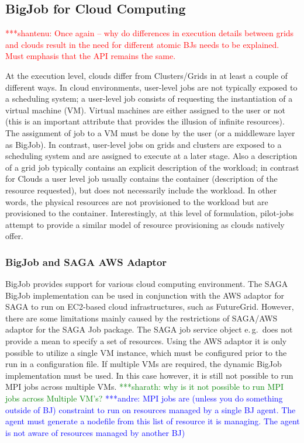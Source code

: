 \documentclass[conference,final]{IEEEtran}
\newcommand{\jhanote}[1]{ {\textcolor{red} { ***shantenu: #1 }}}
\newcommand{\alnote}[1]{ {\textcolor{blue} { ***andre: #1 }}}
\newcommand{\smnote}[1]{ {\textcolor{green} { ***sharath: #1 }}}
\newcommand{\alnote}[1]{}
\newcommand{\smnote}[1]{}
\newcommand{\jhanote}[1]{}
\begin{document}
\subsection{BigJob for Cloud Computing}

\jhanote{Once again -- why do differences in execution details between
  grids and clouds result in the need for different atomic BJs needs
  to be explained. Must emphasis that the API remains the same.}

At the execution level, clouds differ from Clusters/Grids in at least a couple
of different ways. In cloud environments, user-level jobs are not typically
exposed to a scheduling system; a user-level job consists of requesting the
instantiation of a virtual machine (VM). Virtual machines are either assigned to
the user or not (this is an important attribute that provides the illusion of
infinite resources). The assignment of job to a VM must be done by the user (or
a middleware layer as BigJob). In contrast, user-level jobs on grids and 
clusters are exposed to a scheduling system and are
assigned to execute at a later stage. Also a description of a grid job typically
contains an explicit description of the workload; in contrast for Clouds a user
level job usually contains the container (description of the resource
requested), but does not necessarily include the workload. In other words, the
physical resources are not provisioned to the workload but are provisioned to
the container.  Interestingly, at this level of formulation, pilot-jobs attempt 
to provide a similar model of resource provisioning as clouds natively offer. 

\subsubsection{BigJob and SAGA AWS Adaptor}

BigJob provides support for various cloud computing environment. The SAGA BigJob
implementation can be used in conjunction with the AWS adaptor for SAGA to run
on EC2-based cloud infrastructures, such as FutureGrid. However, there are some 
limitations mainly caused by the restrictions of SAGA/AWS adaptor for the SAGA 
Job package. The SAGA job service object e.\,g.\ does not provide a mean to 
specify a set of resources. Using the AWS adaptor it is only possible to utilize 
a single VM instance, which must be configured prior to the run in a 
configuration file. If multiple VMs are required, the dynamic BigJob 
implementation must be used. In this case however, it is still not possible to 
run MPI jobs across multiple VMs. 
\smnote {why is it not possible to run MPI jobs across Multiple VM's?} \alnote{MPI jobs are (unless you do something outside of BJ) constraint to run
on resources managed by a single BJ agent. The agent must generate a nodefile
from this list of resource it is managing. The agent is not aware of resources
managed by another BJ)}
\end{document}

